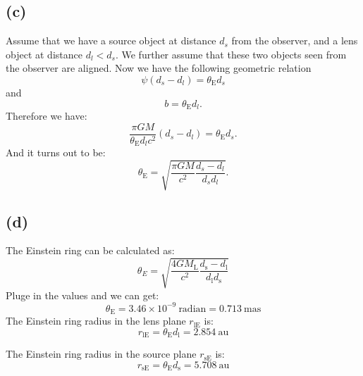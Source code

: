 \documentclass[a4paper,12pt]{article}
\begin{document}
\subsection*{(c)}
Assume that we have a source object at distance $d_s$ from the observer, and a lens object at distance $d_l<d_s$. We further assume that these two objects seen from the observer are aligned. Now we have the following geometric relation
\begin{equation}
    \psi(d_s-d_l)=\theta_\mathrm{E}d_s
\end{equation}
and
\begin{equation}
    b=\theta_\mathrm{E}d_l.
\end{equation}
Therefore we have:
\begin{equation}
    \frac{\pi GM}{\theta_\mathrm{E}d_l c^2}(d_s-d_l)=\theta_\mathrm{E}d_s.
\end{equation}
And it turns out to be:
\begin{equation}
    \theta_\mathrm{E}=\sqrt{\frac{\pi GM}{c^2}\frac{d_s-d_l}{d_s d_l}}.
\end{equation}

\subsection*{(d)}
The Einstein ring can be calculated as:
\begin{equation}
    \theta_E = \sqrt{\frac{4GM_{\text{L}}}{c^2} \frac{d_{\text{s}} - d_{\text{l}}}{d_{\text{l}}d_{\text{s}}}}
\end{equation}
Pluge in the values and we can get:
\begin{equation*}
    \theta_{\text{E}} = 3.46 \times 10^{-9} \ \text{radian} = 0.713 \ \text{mas}
\end{equation*}
The Einstein ring radius in the lens plane $r_{\text{lE}}$ is:
\begin{equation*}
    r_{\text{lE}} = \theta_{\text{E}} d_{\text{l}} = 2.854 \ \text{au}
\end{equation*}

The Einstein ring radius in the source plane $r_{\text{sE}}$ is:
\begin{equation*}
    r_{\text{sE}} = \theta_{\text{E}} d_{\text{s}} = 5.708 \ \text{au}
\end{equation*}
\end{document}
